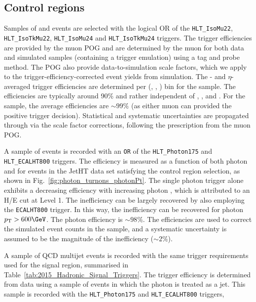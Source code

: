 \subsection{Control regions\label{sec:control_samples}}

Samples of \mj and \mmj events are selected with the logical OR of the
\verb!HLT_IsoMu22!, \verb!HLT_IsoTkMu22!, \verb!HLT_IsoMu24! and
\verb!HLT_IsoTkMu24! triggers. The trigger efficiencies are provided
by the muon POG and are determined by the muon for both data and
simulated samples (containing a trigger emulation) using a tag and
probe method. The POG also provide data-to-simulation scale factors,
which we apply to the trigger-efficiency-corrected event yields from
simulation. The \Pt- and $\eta$-averaged trigger efficiencies are
determined per (\njet, \nb, \scalht) bin for the \mj sample. The
efficiencies are typically around 90\% and rather independent of
\njet, \nb, and \scalht. For the
\mmj sample, the average efficiencies are $\sim99\%$ (as either muon
can provided the positive trigger decision). Statistical and
systematic uncertainties are propagated through via the scale factor
corrections, following the prescription from the muon POG.

A sample of \gj events is recorded with an \verb!OR! of the
\verb!HLT_Photon175! and \verb!HLT_ECALHT800! triggers. The efficiency
is measured as a function of both photon \Pt and \HTmiss for events in
the JetHT data set satisfying the \gj control region selection, as
shown in Fig.~\ref{fig:photon_turnons_photonPt}. The single photon
trigger alone exhibits a decreasing efficiency with increasing photon
\Pt, which is attributed to an H/E cut at Level 1. The inefficiency
can be largely recovered by also employing the \verb!ECALHT800!
trigger. In this way, the inefficiency can be recovered for photon
$\Pt > 600\GeV$. The photon efficiency is $\sim 98\%$. The
efficiencies are used to correct the simulated event counts in the \gj
sample, and a systematic uncertainty is assumed to be the magnitude of
the inefficiency ($\sim 2\%$).

A sample of QCD multijet events is recorded with the same trigger
requirements used for the signal region, summarised in
Table~\ref{tab:2015_Hadronic_Signal_Triggers}. The trigger efficiency
is determined from data using a sample of \gj events in which the
photon is treated as a jet. This sample is recorded with the
\verb!HLT_Photon175! and \verb!HLT_ECALHT800! triggers,


